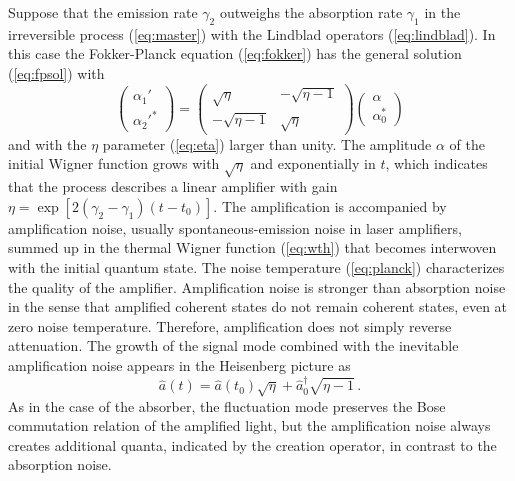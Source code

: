 \documentclass[12pt,amsmath,amssymb]{article}
\numberwithin{equation}{section}
\begin{document}
Suppose that the emission rate $\gamma_2$ outweighs the
absorption rate $\gamma_1$ in the irreversible process
(\ref{eq:master}) with the Lindblad operators
(\ref{eq:lindblad}). In this case the Fokker-Planck equation
(\ref{eq:fokker}) has the general solution (\ref{eq:fpsol}) with
\cite{LeoSU11}
\begin{equation}
\label{eq:amp} \left(
    \begin{array}{c}
     \alpha_1'  \\
     \alpha_2'^*
    \end{array}
\right) = \left(
    \begin{array}{cc}
      \sqrt{\eta} & -\sqrt{\eta-1} \\
      -\sqrt{\eta-1} & \sqrt{\eta}
    \end{array}
\right) \left(
    \begin{array}{c}
     \alpha  \\
     \alpha_0^*
    \end{array}
\right)
\end{equation}
and with the $\eta$ parameter (\ref{eq:eta}) larger than unity.
The amplitude $\alpha$ of the initial Wigner function grows with
$\sqrt{\eta}$ and exponentially in $t$, which indicates that the
process describes a linear amplifier with gain
$\eta=\exp[2(\gamma_2-\gamma_1)(t-t_0)]$. The amplification is
accompanied by amplification noise, usually spontaneous-emission
noise in laser amplifiers, summed up in the thermal Wigner
function (\ref{eq:wth}) that becomes interwoven with the initial
quantum state. The noise temperature (\ref{eq:planck})
characterizes the quality of the amplifier. Amplification noise
is stronger than absorption noise in the sense that amplified
coherent states do not remain coherent states, even at zero noise
temperature.
Therefore, amplification does not simply reverse attenuation.
The growth of the signal mode combined with the inevitable
amplification noise appears in the Heisenberg picture as
\begin{equation}
\hat{a}(t) = \hat{a}(t_0) \sqrt{\eta} + \hat{a}_0^\dagger
\sqrt{\eta-1} \,.
\end{equation}
As in the case of the absorber, the fluctuation mode preserves the
Bose commutation relation of the amplified light, but the
amplification noise always creates additional quanta, indicated
by the creation operator, in contrast to the absorption noise.
\end{document}
